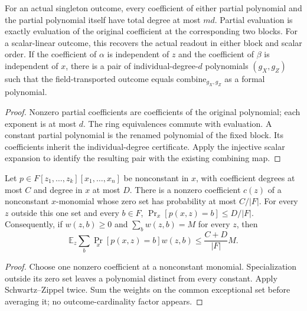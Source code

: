 \begin{theorem}
\label{thm:qld-block-coefficient-degrees}
\leanok
For an actual singleton outcome, every coefficient of either partial
polynomial and the partial polynomial itself have total degree at most $md$.
Partial evaluation is exactly evaluation of the original coefficient at the
corresponding two blocks. For a scalar-linear outcome, this recovers the
actual readout in either block and scalar order.
If the coefficient of $\alpha$ is independent of $z$ and the coefficient
of $\beta$ is independent of $x$, there is a pair of individual-degree-$d$
polynomials $(g_X,g_Z)$ such that the field-transported outcome equals
$\mathrm{combine}_{g_X,g_Z}$ as a formal polynomial.
\end{theorem}
\begin{proof}
\leanok
{}
Nonzero partial coefficients are coefficients of the original polynomial;
each exponent is at most $d$. The ring equivalences commute with evaluation.
A constant partial polynomial is the renamed polynomial of the fixed block.
Its coefficients inherit the individual-degree certificate. Apply the
injective scalar expansion to identify the resulting pair with the existing
combining map.
\end{proof}

\begin{theorem}
\label{thm:qld-common-exceptional-fibers}
\leanok
Let $p\in F[z_1,\ldots,z_k][x_1,\ldots,x_n]$ be nonconstant in $x$,
with coefficient degrees at most $C$ and degree in $x$ at most $D$.
There is a nonzero coefficient $c(z)$ of a nonconstant $x$-monomial whose
zero set has probability at most $C/|F|$. For every $z$ outside this one set and every
$b\in F$, $\Pr_x[p(x,z)=b]\leq D/|F|$.
Consequently, if $w(z,b)\geq0$ and $\sum_b w(z,b)=M$ for every $z$, then
\[
 \mathbb E_z\sum_b\Pr_x[p(x,z)=b]w(z,b)
 \leq \frac{C+D}{|F|}M.
\]
\end{theorem}
\begin{proof}
\leanok
{}
Choose one nonzero coefficient at a nonconstant monomial. Specialization
outside its zero set leaves a polynomial distinct from every constant.
Apply Schwartz--Zippel twice. Sum the weights on the common exceptional
set before averaging it; no outcome-cardinality factor appears.
\end{proof}

